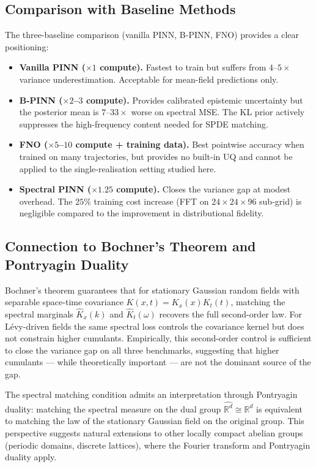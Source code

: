 \documentclass[times,12pt]{elsarticle}
\newcommand{\bbR}{\mathbb{R}}
\begin{document}
\subsection{Comparison with Baseline Methods}

The three-baseline comparison (vanilla PINN, B-PINN, FNO) provides a clear
positioning:
\begin{itemize}
    \item \textbf{Vanilla PINN ($\times 1$ compute).} Fastest to train but suffers
    from $4$--$5\times$ variance underestimation. Acceptable for mean-field
    predictions only.
    \item \textbf{B-PINN ($\times 2$--$3$ compute).} Provides calibrated epistemic
    uncertainty but the posterior mean is $7$--$33\times$ worse on spectral MSE.
    The KL prior actively suppresses the high-frequency content needed for SPDE
    matching.
    \item \textbf{FNO ($\times 5$--$10$ compute + training data).} Best pointwise
    accuracy when trained on many trajectories, but provides no built-in UQ and
    cannot be applied to the single-realisation setting studied here.
    \item \textbf{Spectral PINN ($\times 1.25$ compute).} Closes the variance gap
    at modest overhead. The $25\%$ training cost increase (FFT on $24 \times 24
    \times 96$ sub-grid) is negligible compared to the improvement in
    distributional fidelity.
\end{itemize}

\subsection{Connection to Bochner's Theorem and Pontryagin Duality}

Bochner's theorem guarantees that for stationary Gaussian random fields with
separable space-time covariance $K(x,t) = K_x(x) K_t(t)$, matching the
spectral marginals $\hat{K}_x(k)$ and $\hat{K}_t(\omega)$ recovers the full
second-order law. For L\'evy-driven fields the same spectral loss controls the
covariance kernel but does not constrain higher cumulants. Empirically, this
second-order control is sufficient to close the variance gap on all three
benchmarks, suggesting that higher cumulants --- while theoretically important ---
are not the dominant source of the gap.

The spectral matching condition admits an interpretation through Pontryagin
duality: matching the spectral measure on the dual group $\widehat{\bbR^d}
\cong \bbR^d$ is equivalent to matching the law of the stationary Gaussian
field on the original group. This perspective suggests natural extensions to
other locally compact abelian groups (periodic domains, discrete lattices),
where the Fourier transform and Pontryagin duality apply.
\end{document}
